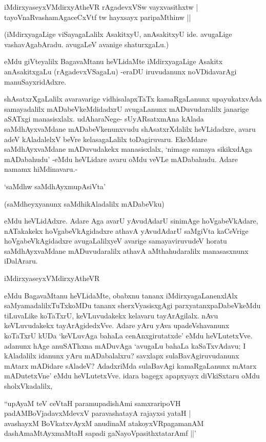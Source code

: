 \begin{shloka}
iMdirxyaseyxVMdirxyAtheVR rAgadevxVSw vayxvasithxtw |\\
tayoVnaRvashamAgaceCxVtf tw hayxsayx paripaMthinw ||
\end{shloka}

(iMdirxyagaLige viSayagaLalilx AsakitxyU, anAsakitxyU ide. avugaLige vashavAgabAradu. avugaLeV avanige shaturxgaLu.)

eMdu giVteyalilx BagavaMtanu heVLidaMte iMdirxyagaLige Asakitx anAsakitxgaLu (rAgadevxVSagaLu) -eraDU iruvudanunx noVDidavarAgi manuSayxridAdxre.

shAsatxrXgaLalilx avaravarige vidhisalapxTaTx kamaRgaLanunx upayukatxvAda samayadalilx mADabeVkeMdidadxrU avugaLanunx mADuvudaralilx janarige aSATxgi manasisxlalx. udAharaNege- sUyARsatxmAna kAlada saMdhAyxvaMdane mADabeVkenunxvudu shAsatxrXdalilx heVLidadxre, avaru adeV kAladalelxV beVre kelasagaLalilx toDagiruvaru. EkeMdare saMdhAyxvaMdane mADuvudakekx manasisxlalx, `nimage samaya sikikxdAga mADabahudu' -eMdu heVLidare avaru oMdu veVLe mADabahudu. Adare namamx hiMdinavaru.-

\begin{shloka}
`saMdhw saMdhAyxmupAsiVta'
\end{shloka}

(saMdheyxyanunx saMdhikAladalilx mADabeVku)

eMdu heVLidAdxre. Adare Aga avarU yAvudAdarU sinimAge hoVgabeVkAdare, nATakakekx hoVgabeVkAgidadxre athavA yAvudAdarU saMgiVta kaCeVrige hoVgabeVkAgidadxre avugaLalilxyeV avarige samayaviruvudeV horatu saMdhAyxvaMdane mADuvudaralilx athavA aMthahudaralilx manasasxnunx iDalAraru.

\begin{shloka}
iMdirxyaseyxVMdirxyAtheVR
\end{shloka}

\noindent eMdu BagavaMtanu heVLidaMte, obabxnu tananx iMdirxyagaLanenxlAlx saMyamadalilxTuTxkoMDu tananx sherxVyasisxgAgi parxyatanxpaDabeVkeMdu tiLuvaLike koTaTxrU, keVLuvudakekx kelavaru tayArAgilalx. nAvu keVLuvudakekx tayArAgidedxVve. Adare yAru yAva upadeVshavanunx koTaTxrU kUDa `keVLuvAga bahaLa cenAnxgirutatxde' eMdu heVLutetxVve. adanunx hAge anuSAThxna mADuvAga `avugaLu bahaLa kaSaTxvAdavu; I kAladalilx idanunx yAru mADabalalxru? savxlapx sulaBavAgiruvudanunx mAtarx mADidare sAladeV? AdadxriMda sulaBavAgi kamaRgaLanunx mAtarx mADutetxVne' eMdu heVLutetxVve. idara bagegx apapxyayx diVkiSxtaru oMdu sholxVkadalilx,

\begin{shloka}
``upAyaM teV ceVtaH paramupadishAmi samxraripoVH\\
padAMBoVjadavxMdevxV paravashatayA rajayxsi yataH |\\
avashayxM BoVkatxvAyxM anudinaM atakoyxVR\s pagamanAM\\
dashAmaMtAyxmaMtaH sapadi gaNayoVpasithxtatarAmf ||'
\end{shloka}

